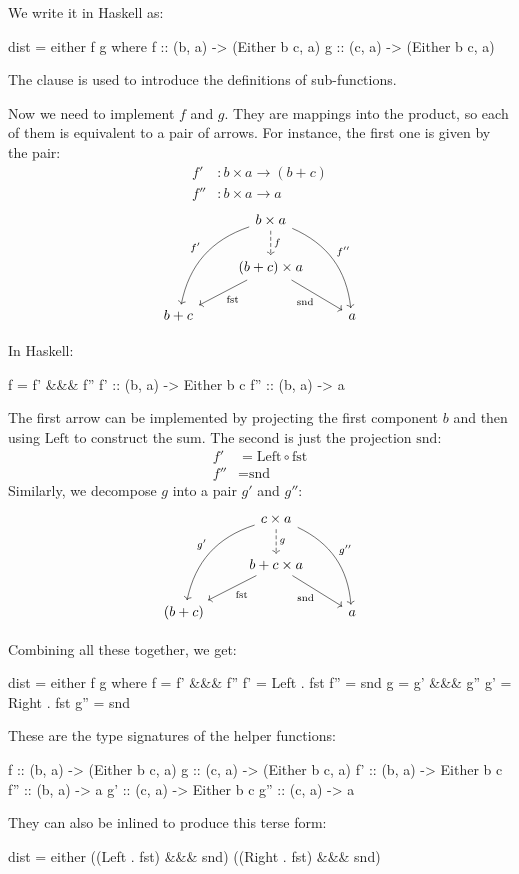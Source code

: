 \documentclass[DaoFP]{subfiles}
\begin{document}
We write it in Haskell as:
\begin{haskell}
dist = either f g
  where
    f   :: (b, a) -> (Either b c, a)
    g   :: (c, a) -> (Either b c, a)
\end{haskell}
The  clause is used to introduce the definitions of sub-functions.

Now we need to implement $f$ and $g$. They are mappings into the product, so each of them is equivalent to a pair of arrows. For instance, the first one is given by the pair:
\begin{align*}
f' &\colon b \times a \to (b + c) \\
f'' &\colon b \times a \to  a
\end{align*}
\[
 \begin{tikzcd}
 & b \times a
\arrow[d, dashed, "f"]
 \arrow[ddl, bend right, "f'"']
 \arrow[ddr, bend left, "f''"]
\\
& (b + c) \times a
 \arrow[dl,  "\text{fst}"]
  \arrow[dr,   "\text{snd}"']
\\
b + c && a
 \end{tikzcd}
\]

In Haskell:
\begin{haskell}
    f = f' &&& f''
    f'  :: (b, a) -> Either b c
    f'' :: (b, a) -> a
\end{haskell}
The first arrow can be implemented by projecting the first component $b$ and then using $\text{Left}$ to construct the sum. The second is just the projection $\text{snd}$:
\begin{align*}
 f' &= \text{Left} \circ \text{fst} \\
 f'' &= \text{snd}
\end{align*}
Similarly, we decompose $g$ into a pair $g'$ and $g''$:
\[
 \begin{tikzcd}
 & c \times a
\arrow[d, dashed, "g"]
 \arrow[ddl, bend right, "g'"']
 \arrow[ddr, bend left, "g''"]
\\
& b + c \times a
 \arrow[dl,  "\text{fst}"]
  \arrow[dr,   "\text{snd}"']
\\
(b + c) && a
 \end{tikzcd}
\]

Combining all these together, we get:
\begin{haskell}
dist = either f g
  where
    f   = f' &&& f''
    f'  = Left . fst
    f'' = snd
    g   = g' &&& g''
    g'  = Right . fst
    g'' = snd
\end{haskell}
These are the type signatures of the helper functions:
\begin{haskell}
    f   :: (b, a) -> (Either b c, a)
    g   :: (c, a) -> (Either b c, a)
    f'  :: (b, a) -> Either b c
    f'' :: (b, a) -> a
    g'  :: (c, a) -> Either b c
    g'' :: (c, a) -> a
\end{haskell}
They can also be inlined to produce this terse form:
\begin{haskell}
dist = either ((Left . fst) &&& snd) ((Right . fst) &&& snd)
\end{haskell}
\end{document}
